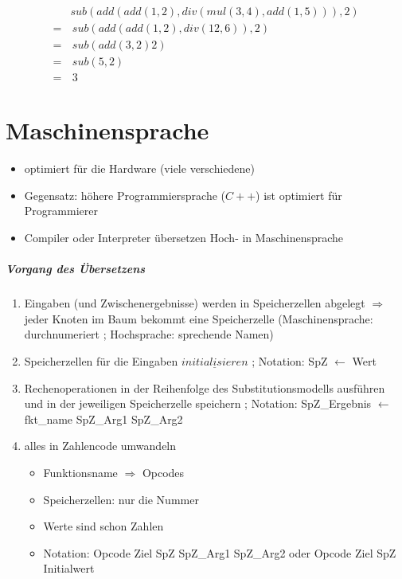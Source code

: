 \documentclass{article}
\begin{document}
		\begin{align*}
			&  	sub(add(add(1,2), div(mul(3,4), add(1,5))),2) \\
			= & \, sub(add(add(1,2), div(12, 6)),2) \\
			= & \, sub(add(3,2)2) \\
			= & \, sub(5,2) \\
			= & \, 3
		\end{align*}
		
		\chapter{Maschinensprache}
		\begin{itemize}
			\item optimiert für die Hardware (viele verschiedene)
			\item Gegensatz: höhere Programmiersprache ($C++$) ist optimiert für Programmierer
			\item Compiler oder Interpreter übersetzen Hoch- in Maschinensprache 
		\end{itemize}
		
		\paragraph{Vorgang des Übersetzens}
		\begin{enumerate}
			\item Eingaben (und Zwischenergebnisse) werden in Speicherzellen abgelegt $ \Rightarrow$ jeder Knoten im Baum bekommt eine Speicherzelle (Maschinensprache: durchnumeriert ; Hochsprache: sprechende Namen)
			\item Speicherzellen für die Eingaben $\underline{initialisieren}$ ; Notation: SpZ $\leftarrow$ Wert
			\item Rechenoperationen in der Reihenfolge des Substitutionsmodells ausführen und in der jeweiligen Speicherzelle speichern ; Notation: SpZ\_Ergebnis $\leftarrow$ fkt\_name SpZ\_Arg1 SpZ\_Arg2
			\item alles in Zahlencode umwandeln
			\begin{itemize}
				\item Funktionsname $\Rightarrow$ Opcodes
				\item Speicherzellen: nur die Nummer
				\item Werte sind schon Zahlen
				\item Notation: Opcode \quad Ziel SpZ \quad SpZ\_Arg1 \quad SpZ\_Arg2 oder Opcode \quad Ziel SpZ \quad Initialwert
				
			\end{itemize}
		\end{enumerate}
		
	
\end{document}
